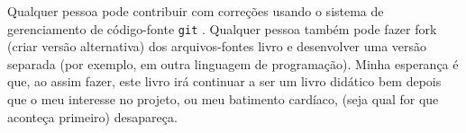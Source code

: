 Qualquer pessoa pode contribuir com correções usando o sistema de gerenciamento
de código-fonte \texttt{git}
. Qualquer pessoa também pode fazer fork (criar versão alternativa) dos arquivos-fontes 
livro e desenvolver uma versão separada (por exemplo, em outra linguagem de programação).
Minha esperança é que, ao assim fazer, este livro irá continuar a
ser um livro didático bem depois que o meu interesse no projeto, ou meu batimento cardíaco, (seja qual for que aconteça primeiro) desapareça.


